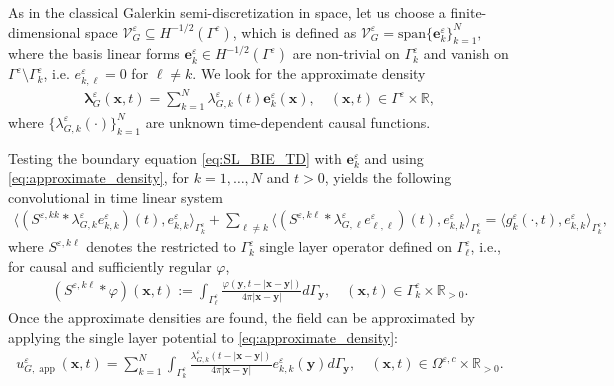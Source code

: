 \documentclass[]{article}
\numberwithin{equation}{section}
\numberwithin{theorem}{section}
\numberwithin{lemma}{section}
\numberwithin{corollary}{section}
\numberwithin{proposition}{section}
\numberwithin{definition}{section}
\newcommand{\bx}{\boldsymbol{x}}
\newcommand{\by}{\boldsymbol{y}}
\newcommand{\be}{\boldsymbol{e}}
\newcommand{\blambda}{\boldsymbol{\lambda}}
\newcommand{\re}{\varepsilon}
\renewcommand{\vec}{\boldsymbol}
\begin{document}
	As in the classical Galerkin semi-discretization in space, let us choose a finite-dimensional space $\mathcal{V}^{\re}_G \subseteq H^{-1/2}(\Gamma^{\re})$, which is defined as
	$	\mathcal{V}^{\re}_G = \text{span}\{ \boldsymbol{e}_k^{\re}\}_{k=1}^N,
	$
	where the basis linear forms $\boldsymbol{e}_k^{\re}\in H^{-1/2}(\Gamma^{\re})$ are non-trivial on $\Gamma_k^{\re}$ and vanish on $\Gamma^{\re} \setminus \Gamma_k^{\re}$, i.e. $e^{\re}_{k,\ell}=0$ for $\ell\neq k$. 
	We look for the approximate density
	\begin{align}
		\label{eq:approximate_density}
		\blambda^{\re}_G(\boldsymbol{x}, t) = \sum_{k=1}^N \lambda^{\re}_{G, k}(t) \be_k^{\re}(\boldsymbol{x}), \quad (\boldsymbol{x}, t) \in \Gamma^{\re} \times \mathbb{R},
	\end{align}
	where $\{ \lambda^{\re}_{G, k} (\cdot) \}_{k=1}^N$ are unknown time-dependent causal functions.
	
	Testing the boundary equation \eqref{eq:SL_BIE_TD} with $\vec{e}_k^{\re}$ and using \eqref{eq:approximate_density}, for $k=1,\ldots,N$ and $t>0$,  yields the following convolutional in time linear system  
	\begin{align}
		\label{eq:general_asymtotic_model}
		\langle (S^{\re, kk} *  \lambda^{\re}_{G, k} e_{k,k}^{\re})(t), e_{k,k}^{\re} \rangle_{\Gamma^{\re}_k} + \sum_{\ell\neq k} \langle  (S^{\re, k\ell} *  \lambda^{\re}_{G, \ell} e_{\ell,\ell}^{\re})(t), e_{k,k}^{\re} \rangle_{\Gamma^{\re}_k} = \langle g^{\re}_k(\cdot, t), e_{k,k}^{\re}  \rangle_{\Gamma^{\re}_k},
	\end{align}
	where $S^{\re, k\ell}$ denotes the restricted to $\Gamma^{\re}_{k}$ single layer operator defined on $\Gamma^{\re}_{\ell}$, i.e., for causal and sufficiently regular $\varphi$, 
	\begin{align*}%
		(S^{\re, k{\ell}} * \varphi) (\boldsymbol{x}, t) := \int_{\Gamma^{\re}_{\ell}}  \frac{ \varphi(\boldsymbol{y},t-|\bx-\by|)}{4\pi|\bx-\by|} d\Gamma_{\boldsymbol{y}}, \quad (\boldsymbol{x}, t) \in \Gamma^{\re}_k \times \mathbb{R}_{>0}.
	\end{align*}
	Once the approximate densities are found, the field can be approximated by applying the single layer potential to \eqref{eq:approximate_density}:
	\begin{align}
		u^{\re}_{G,\operatorname{app}}(\vec{x},t)=\sum\limits_{k=1}^N \int_{\Gamma^{\re}_k}\frac{\lambda_{G,k}^{\re}(t-|\vec{x}-\vec{y}|)}{4\pi|\vec{x}-\vec{y}|}e_{k,k}^{\re}(\vec{y})d\Gamma_{\vec{y}}, \quad (\vec{x},t)\in \Omega^{\re,c}\times \mathbb{R}_{>0}.
	\end{align}
	
\end{document}
